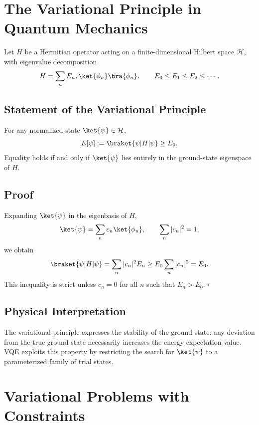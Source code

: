 \documentclass{book}
\begin{document}
\section{The Variational Principle in Quantum Mechanics}

Let $H$ be a Hermitian operator acting on a finite-dimensional Hilbert space $\mathcal{H}$, with eigenvalue decomposition
\begin{equation}
H = \sum_{n} E_n , \ket{\phi_n}\bra{\phi_n}, \qquad E_0 \le E_1 \le E_2 \le \cdots.
\end{equation}

\subsection{Statement of the Variational Principle}

For any normalized state $\ket{\psi} \in \mathcal{H}$,
\begin{equation}
E[\psi] := \braket{\psi|H|\psi} \ge E_0.
\end{equation}
Equality holds if and only if $\ket{\psi}$ lies entirely in the ground-state eigenspace of $H$.

\subsection{Proof}

Expanding $\ket{\psi}$ in the eigenbasis of $H$,
\begin{equation}
\ket{\psi} = \sum_n c_n \ket{\phi_n}, \qquad \sum_n |c_n|^2 = 1,
\end{equation}
we obtain
\begin{equation}
\braket{\psi|H|\psi} = \sum_n |c_n|^2 E_n \ge E_0 \sum_n |c_n|^2 = E_0.
\end{equation}
This inequality is strict unless $c_n = 0$ for all $n$ such that $E_n > E_0$. \hfill $\square$

\subsection{Physical Interpretation}

The variational principle expresses the stability of the ground state: any deviation from the true ground state necessarily increases the energy expectation value. VQE exploits this property by restricting the search for $\ket{\psi}$ to a parameterized family of trial states.

\section{Variational Problems with Constraints}
\end{document}
